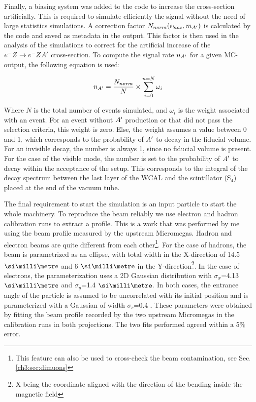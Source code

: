 Finally, a biasing system was added to the code to increase the cross-section artificially. This is required to simulate efficiently the signal without the need of large statistics simulations. A correction factor $N_{norm}(\epsilon_{bias},m_{A'})$ is calculated by the code and saved as metadata in the output. This factor is then used in the analysis of the simulations to correct for the artificial increase of the $e^- Z \to e^- Z A'$ cross-section. To compute the signal rate $n_{A'}$ for a given MC-output, the following equation is used:

\begin{equation}
  \label{eq:1}
  n_{A'} = \frac{N_{norm}}{N} \times \sum^{n=N}_{i=0} \omega_i
\end{equation}

Where $N$ is the total number of events simulated, and $\omega_i$ is the weight associated with an event. For an event without $A'$ production or that did not pass the selection criteria, this weight is zero. Else, the weight assumes a value between 0 and 1, which corresponds to the probability of $A'$ to decay in the fiducial volume. For an invisible decay, the number is always 1, since no fiducial volume is present. For the case of the visible mode, the number is set to the probability of $A'$ to decay within the acceptance of the setup. This corresponds to the integral of the decay spectrum between the last layer of the WCAL and the scintillator (S$_4$) placed at the end of the vacuum tube.

The final requirement to start the simulation is an input particle to start the whole machinery. 
To reproduce the beam reliably we use electron and hadron calibration runs to extract a profile. This is a work that was performed by me using the beam profile measured by the upstream Micromegas. Hadron and electron beams are quite different from each other\footnote{This feature can also be used to cross-check the beam contamination, see Sec.\ref{ch3:sec:dimuons}}. For the case of hadrons, the beam is parametrized as an ellipse, with total width in the X-direction of 14.5 $\mmi$ and 6 $\mmi$ in the Y-direction\footnote{X being the coordinate aligned with the direction of the bending inside the magnetic field}. In the case of electrons, the parameterization uses a 2D Gaussian distribution with $\sigma_x$=4.13 $\mmi$ and $\sigma_y$=1.4 $\mmi$. In both cases, the entrance angle of the particle is assumed to be uncorrelated with its initial position and is parameterized with a Gaussian of width $\sigma_r$=0.4 \mrad. These parameters were obtained by fitting the beam profile recorded by the two upstream Micromegas in the calibration runs in both projections. The two fits performed agreed within a 5\% error.
\clearpage
